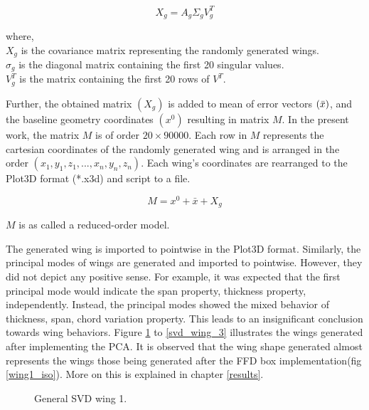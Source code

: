 \begin{equation}
   X_g = A_g \Sigma_g V^T_g
   \label{svd_approx}
\end{equation}

where,\\
$X_g$ is the covariance matrix representing the randomly generated wings.\\
$\sigma_g$ is the diagonal matrix containing the first 20 singular values.\\
$V^T_g$ is the matrix containing the first 20 rows of $V^T$.

Further, the obtained matrix $(X_g)$ is added to mean of error vectors $(\Bar{x})$, and the baseline geometry coordinates $(x^0)$ resulting in matrix $M$. In the present work, the matrix $M$ is of order $20 \times 90000$. Each row in $M$ represents the cartesian coordinates of the randomly generated wing and is arranged in the order $(x_1, y_1, z_1, ..., x_n, y_n, z_n)$. Each wing's coordinates are rearranged to the Plot3D format (*.x3d) and script to a file.

$$ M = x^0 + \bar{x} + X_g $$

$M$ is as called a reduced-order model.

The generated wing is imported to pointwise in the Plot3D format. Similarly, the principal modes of wings are generated and imported to pointwise. However, they did not depict any positive sense. For example, it was expected that the first principal mode would indicate the span property, thickness property, independently. Instead, the principal modes showed the mixed behavior of thickness, span, chord variation property. This leads to an insignificant conclusion towards wing behaviors. Figure \ref{svd_wing_1} to \ref{svd_wing_3} illustrates the wings generated after implementing the PCA. It is observed that the wing shape generated almost represents the wings those being generated after the FFD box implementation(fig \ref{wing1_iso}). More on this is explained in chapter \ref{results}.

\begin{figure}
    \centering
    \caption{General SVD wing 1.}
    \label{svd_wing_1}
\end{figure}

